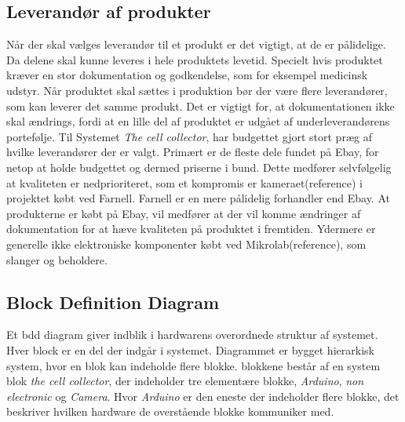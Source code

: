 \subsection{Leverandør af produkter}
Når der skal vælges leverandør til et produkt er det vigtigt, at de er pålidelige. Da delene skal kunne leveres i hele produktets levetid. Specielt hvis produktet kræver en stor dokumentation og godkendelse, som for eksempel medicinsk udstyr. Når produktet skal sættes i produktion bør der være flere leverandører, som kan leverer det samme produkt. Det er vigtigt for, at dokumentationen ikke skal ændrings, fordi at en lille del af produktet er udgået af underleverandørens portefølje.
Til Systemet \textit{The cell collector}, har budgettet gjort stort præg af hvilke leverandører der er valgt. Primært er de fleste dele fundet på Ebay, for netop at holde budgettet og dermed priserne i bund. Dette medfører selvfølgelig at kvaliteten er nedprioriteret, som et kompromis er kameraet(reference) i projektet købt ved Farnell. Farnell er en mere pålidelig forhandler end Ebay. At produkterne er købt på Ebay, vil medfører at der vil komme ændringer af dokumentation for  at hæve kvaliteten på produktet i fremtiden. Ydermere er generelle ikke elektroniske komponenter købt ved Mikrolab(reference), som slanger og beholdere. 




 
 
 
 
 \newpage
\subsection{Block Definition Diagram} 
Et bdd diagram giver indblik i hardwarens overordnede struktur af systemet. Hver block er en del der indgår i systemet. Diagrammet er bygget hierarkisk system, hvor en blok kan indeholde flere blokke. blokkene består af en system blok \textit{the cell collector}, der indeholder tre elementære blokke, \textit{Arduino}, \textit{non electronic} og \textit{Camera}. Hvor \textit{Arduino} er den eneste der indeholder flere blokke, det beskriver hvilken hardware de overstående blokke kommuniker med.


